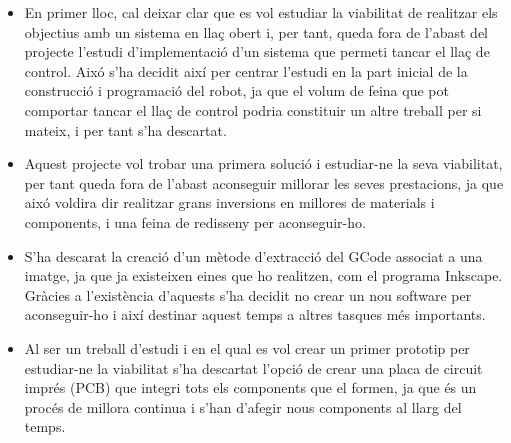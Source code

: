 \begin{itemize}
	\item En primer lloc, cal deixar clar que es vol estudiar la viabilitat de realitzar els objectius amb un sistema en llaç obert i, per tant, queda fora de l'abast del projecte l'estudi d'implementació d'un sistema que permeti tancar el llaç de control. Aixó s'ha decidit així per centrar l'estudi en la part inicial de la construcció i programació del robot, ja que el volum de feina que pot comportar tancar el llaç de control podria constituir un altre treball per si mateix, i per tant s'ha descartat. 
	
	\item Aquest projecte vol trobar una primera solució i estudiar-ne la seva viabilitat, per tant queda fora de l'abast aconseguir millorar les seves prestacions, ja que aixó voldira dir realitzar grans inversions en millores de materials i components, i una feina de redisseny per aconseguir-ho.
	
	\item S'ha descarat la creació d'un mètode d'extracció del GCode associat a una imatge, ja que ja existeixen eines que ho realitzen, com el programa Inkscape. Gràcies a l'existència d'aquests s'ha decidit no crear un nou software per aconseguir-ho i així destinar aquest temps a altres tasques més importants.
	
	\item Al ser un treball d'estudi i en el qual es vol crear un primer prototip per estudiar-ne la viabilitat s'ha descartat l'opció de crear una placa de circuit imprés (PCB) que integri tots els components que el formen, ja que és un procés de millora continua i s'han d'afegir nous components al llarg del temps.   
\end{itemize}











